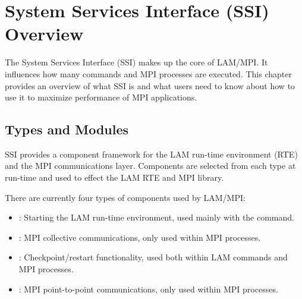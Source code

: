 %
% 
%
%

\chapter{System Services Interface (SSI) Overview}
\label{sec:ssi}

The System Services Interface (SSI) makes up the core of LAM/MPI.  It
influences how many commands and MPI processes are executed.  This
chapter provides an overview of what SSI is and what users need to
know about how to use it to maximize performance of MPI applications.


\section{Types and Modules}

SSI provides a component framework for the LAM run-time environment
(RTE) and the MPI communications layer.  Components are selected from
each type at run-time and used to effect the LAM RTE and MPI library.

There are currently four types of components used by
LAM/MPI:

\begin{itemize}
\item {}: Starting the LAM run-time environment, used mainly
  with the  command.

\item {}: MPI collective communications, only used within MPI
  processes.

\item {}: Checkpoint/restart functionality, used both within
  LAM commands and MPI processes.

\item {}: MPI point-to-point communications, only used within
  MPI processes.  
\end{itemize}

